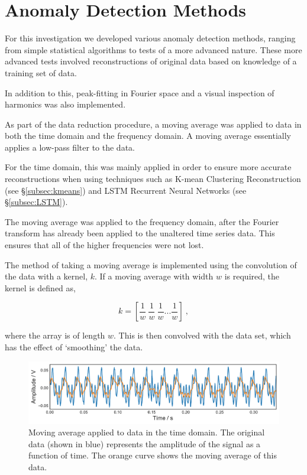 \section{Anomaly Detection Methods}
\label{sec:methods}

For this investigation we developed various anomaly detection methods, ranging from simple statistical algorithms to tests of a more advanced nature. These more advanced tests involved reconstructions of original data based on knowledge of a training set of data.

In addition to this, peak-fitting in Fourier space and a visual inspection of harmonics was also implemented.

As part of the data reduction procedure, a moving average was applied to data in both the time domain and the frequency domain. A moving average essentially applies a low-pass filter to the data.

For the time domain, this was mainly applied in order to ensure more accurate reconstructions when using techniques such as K-mean Clustering Reconstruction (see \S\ref{subsec:kmeans}) and LSTM Recurrent Neural Networks (see \S\ref{subsec:LSTM}).

The moving average was applied to the frequency domain, after the Fourier transform has already been applied to the unaltered time series data. This ensures that all of the higher frequencies were not lost.

The method of taking a moving average is implemented using the convolution of the data with a kernel, $k$. If a moving average with width $w$ is required, the kernel is defined as,

\begin{equation}
    k = \left[ \dfrac{1}{w}~\dfrac{1}{w}~\dfrac{1}{w}...\dfrac{1}{w}  \right]~,
    \label{eq:conv_kernel}
\end{equation}

where the array is of length $w$. This is then convolved with the data set, which has the effect of `smoothing' the data.

\begin{figure}[t]
    \includegraphics[width=1.0\textwidth]{fig/moving_average.pdf}
    \caption[Time Domain]{Moving average applied to data in the time domain. The original data (shown in blue) represents the amplitude of the signal as a function of time. The orange curve shows the moving average of this data.}
    \label{fig:moving_av}
\end{figure}

